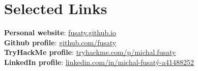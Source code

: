 \documentclass[letterpaper,11pt]{article}
\begin{document}
 
\section{Selected Links}
 \begin{itemize}[leftmargin=0.15in, label={}]
    \small{\item{
     \textbf{Personal website}{: \href{https://fusaty.github.io/}{fusaty.github.io}} \\
     \textbf{Github profile}{: \href{https://github.com/fusaty}{github.com/fusaty}} \\
     \textbf{TryHackMe profile}{: \href{https://tryhackme.com/p/michal.fusaty}{tryhackme.com/p/michal.fusaty}} \\
     \textbf{LinkedIn profile}{: \href{https://linkedin.com/in/michal-fusatý-a41488252}{linkedin.com/in/michal-fusatý-a41488252}} \\
    }}
 \end{itemize}

\end{document}
